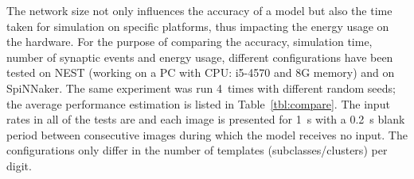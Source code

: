 The network size not only influences the accuracy of a model but also the time taken for simulation on specific platforms, thus impacting the energy usage on the hardware.
For the purpose of comparing the accuracy, simulation time, number of synaptic events and energy usage, different configurations have been tested on NEST (working on a PC with CPU: i5-4570 and 8G \protect{} memory) and on SpiNNaker.
The same experiment was run 4~times with different random seeds; the average performance estimation is listed in Table~\ref{tbl:compare}.
The input rates in all of the tests are \protect{} \protect{} and each image is presented for 1~s with a 0.2~s blank period between consecutive images during which the model receives no input.
The configurations only differ in the number of templates (subclasses/clusters) per digit.
